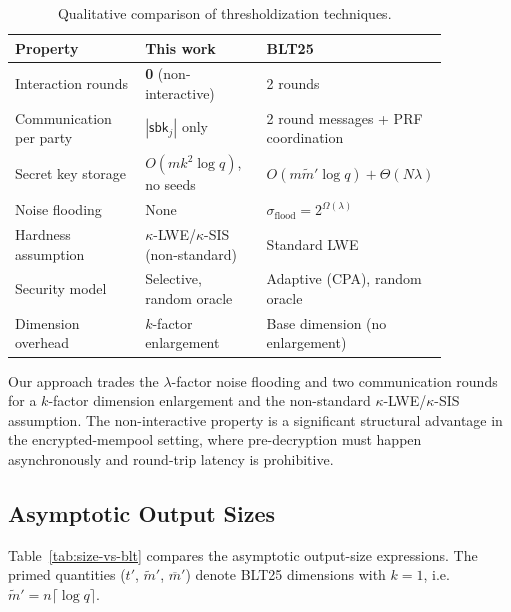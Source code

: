 \begin{table}[h]
\centering
\renewcommand{\arraystretch}{1.3}
\begin{tabular}{|p{0.30\linewidth}|p{0.28\linewidth}|p{0.28\linewidth}|}
\hline
\textbf{Property} & \textbf{This work} & \textbf{\textsf{BLT25}~\cite{EPRINT:BonLauTas25}} \\
\hline
Interaction rounds & \textbf{0} (non-interactive) & 2 rounds \\
\hline
Communication per party & $|\mathsf{sbk}_j|$ only & 2 round messages + PRF coordination \\
\hline
Secret key storage & $O(mk^2\log q)$, no seeds & $O(m\widetilde{m}'\log q) + \Theta(N\lambda)$ \\
\hline
Noise flooding & None & $\sigma_{\mathrm{flood}}=2^{\Omega(\lambda)}$ \\
\hline
Hardness assumption & $\kappa$-LWE/$\kappa$-SIS (non-standard) & Standard LWE \\
\hline
Security model & Selective, random oracle & Adaptive (CPA), random oracle \\
\hline
Dimension overhead & $k$-factor enlargement & Base dimension (no enlargement) \\
\hline
\end{tabular}
\caption{Qualitative comparison of thresholdization techniques.}
\label{tab:tradeoffs}
\end{table}

Our approach trades the $\lambda$-factor noise flooding and two communication rounds for a
$k$-factor dimension enlargement and the non-standard $\kappa$-LWE/$\kappa$-SIS assumption.
The non-interactive property is a significant structural advantage in the encrypted-mempool
setting, where pre-decryption must happen asynchronously and round-trip latency is
prohibitive.

\subsection{Asymptotic Output Sizes}

Table~\ref{tab:size-vs-blt} compares the asymptotic output-size expressions.
The primed quantities ($t'$, $\widetilde{m}'$, $\overline{m}'$) denote \textsf{BLT25}
dimensions with $k=1$, i.e.\ $\widetilde{m}'=n\lceil\log q\rceil$.

